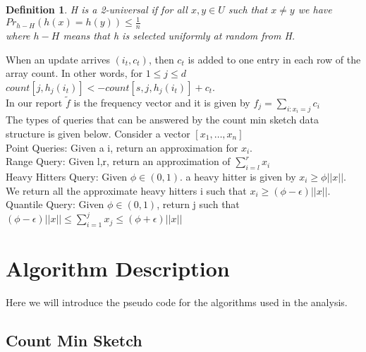 \documentclass[]{report}
\newtheorem{definition}{Definition}
\begin{document}
\begin{definition}
H is a 2-universal if for all $x, y \in U$ such that $x \neq y$ we have\\

$Pr_{h - H} (h(x) = h(y)) \leq \frac{1}{n}$\\

where $h - H$ means that h is selected uniformly at random from H.\\
\end{definition}


When an update arrives $(i_t, c_t)$, then $c_t$ is added to one entry in each row of the array count. In other words, for $1 \leq j \leq d\ $ $count[j, h_j(i_t)] <- count[s, j, h_j(i_t)] + c_t$.\\

In our report $\tilde{f}$ is the frequency vector and it is given by $f_j = \sum_{i: x_i = j}c_i$\\

The types of queries that can be answered by the count min sketch data structure is given below. Consider a vector $[x_ 1, \hdots, x_n]$\\

Point Queries: Given a i, return an approximation for $x_i$.\\

Range Query: Given l,r, return an approximation of $\sum_{i=l}^{r} x_i$\\

Heavy Hitters Query: Given $\phi \in (0,1)$. a heavy hitter is given by $x_i \geq \phi||x||$. We return all the approximate heavy hitters i such that $x_i \geq (\phi - \epsilon)||x||$.\\


Quantile Query: Given $\phi \in (0,1)$, return j such that $ (\phi - \epsilon)||x|| \leq \sum_{i=1}^{j}x_j \leq (\phi + \epsilon)||x||$


\chapter{Algorithm Description}                

Here we will introduce the pseudo code for the algorithms used in the analysis.\\

\section{Count Min Sketch}   
\end{document}

